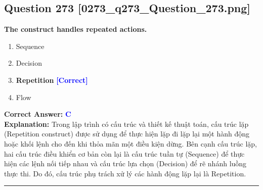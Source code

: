 \documentclass[11pt,a4paper]{article}
\begin{document}
\begin{minipage}{\textwidth}
\subsection*{Question 273 \quad \footnotesize{[0273\_q273\_Question\_273.png]}}
\noindent \textbf{The construct handles repeated actions.}

\begin{enumerate}[label=\Alph*.]
    \item Sequence
    \item Decision
    \item \textbf{Repetition} \hfill \textcolor{blue}{\textbf{[Correct]}}
    \item Flow
\end{enumerate}

\noindent \textbf{Correct Answer:} \textcolor{blue}{\textbf{C}} \\[2pt]
\noindent \textbf{Explanation:} Trong lập trình có cấu trúc và thiết kế thuật toán, cấu trúc lặp (Repetition construct) được sử dụng để thực hiện lặp đi lặp lại một hành động hoặc khối lệnh cho đến khi thỏa mãn một điều kiện dừng. Bên cạnh cấu trúc lặp, hai cấu trúc điều khiển cơ bản còn lại là cấu trúc tuần tự (Sequence) để thực hiện các lệnh nối tiếp nhau và cấu trúc lựa chọn (Decision) để rẽ nhánh luồng thực thi. Do đó, cấu trúc phụ trách xử lý các hành động lặp lại là Repetition.

\par\vspace{0.3cm}
\hrule
\vspace{0.3cm}
\end{minipage}
\end{document}
